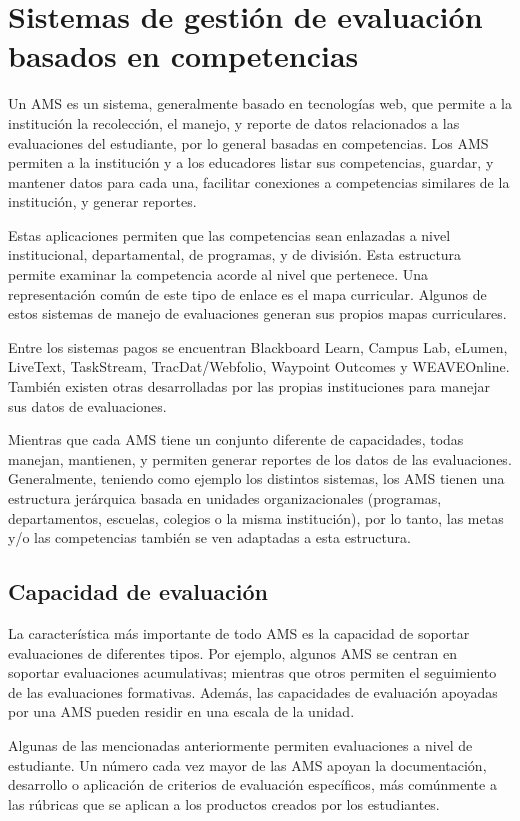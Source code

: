 \section{Sistemas de gestión de evaluación basados en competencias}
Un AMS es un sistema, generalmente basado en tecnologías web, que permite a la institución la recolección, el manejo, y reporte de datos relacionados a las evaluaciones del estudiante, por lo general basadas en competencias. Los AMS permiten a la institución y a los educadores listar sus competencias, guardar, y mantener datos para cada una, facilitar conexiones a competencias similares de la institución, y generar reportes\citep{cartwright2009student}.

Estas aplicaciones permiten que las competencias sean enlazadas a nivel institucional, departamental, de programas, y de división. Esta estructura permite examinar la competencia
acorde al nivel que pertenece. Una representación común de este tipo de enlace es el mapa curricular\citep{oakleaf_choosing_2013}. Algunos de estos sistemas de manejo de evaluaciones generan sus propios mapas curriculares.

Entre los sistemas pagos se encuentran Blackboard Learn, Campus Lab, eLumen, LiveText, TaskStream, TracDat/Webfolio, Waypoint Outcomes y WEAVEOnline. También existen otras desarrolladas por las propias instituciones para manejar sus datos de evaluaciones.

Mientras que cada AMS tiene un conjunto diferente de capacidades, todas manejan, mantienen, y permiten generar reportes de los datos de las evaluaciones. Generalmente, teniendo como ejemplo los distintos sistemas, los AMS tienen una estructura jerárquica basada en unidades organizacionales (programas, departamentos, escuelas, colegios o la misma institución), por lo tanto, las metas y/o las competencias también se ven adaptadas a esta estructura.

\subsection{Capacidad de evaluación}
La característica más importante de todo AMS es la capacidad de soportar evaluaciones de diferentes tipos\citep{oakleaf_choosing_2013}. Por ejemplo, algunos AMS se centran en soportar evaluaciones acumulativas; mientras que otros permiten el seguimiento de las evaluaciones formativas. Además, las capacidades de evaluación apoyadas por una AMS pueden residir en una escala de la unidad.

Algunas de las mencionadas anteriormente permiten evaluaciones a nivel de estudiante. Un número cada vez mayor de las AMS apoyan la documentación, desarrollo o aplicación de criterios de evaluación específicos, más comúnmente a las rúbricas que se aplican a los productos creados por los estudiantes.

